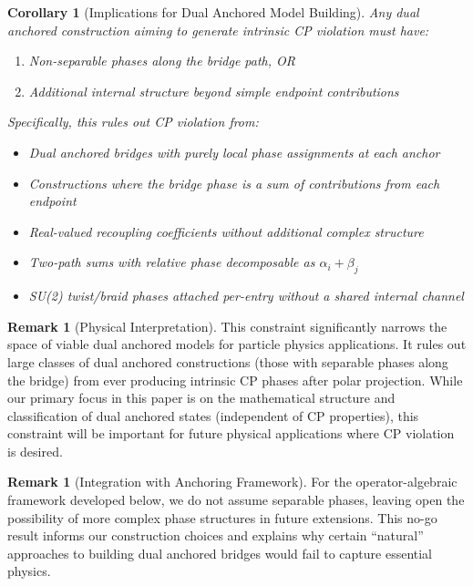 \documentclass[11pt]{article}
\theoremstyle{plain}
\newtheorem{corollary}[theorem]{Corollary}
\theoremstyle{definition}
\newtheorem{remark}[theorem]{Remark}
\begin{document}
\begin{corollary}[Implications for Dual Anchored Model Building]
  \label{cor:phase-separable}
  Any dual anchored construction aiming to generate intrinsic CP violation must have:
  \begin{enumerate}
    \item Non-separable phases along the bridge path, OR
    \item Additional internal structure beyond simple endpoint contributions
  \end{enumerate}

  Specifically, this rules out CP violation from:
  \begin{itemize}
    \item Dual anchored bridges with purely local phase assignments at each anchor
    \item Constructions where the bridge phase is a sum of contributions from each endpoint
    \item Real-valued recoupling coefficients without additional complex structure
    \item Two-path sums with relative phase decomposable as $\alpha_i + \beta_j$
    \item SU(2) twist/braid phases attached per-entry without a shared internal channel
  \end{itemize}
\end{corollary}

\begin{remark}[Physical Interpretation]
  This constraint significantly narrows the space of viable dual anchored models for particle physics applications. It rules out large classes of dual anchored constructions (those with separable phases along the bridge) from ever producing intrinsic CP phases after polar projection. While our primary focus in this paper is on the mathematical structure and classification of dual anchored states (independent of CP properties), this constraint will be important for future physical applications where CP violation is desired.
\end{remark}

\begin{remark}[Integration with Anchoring Framework]
  For the operator-algebraic framework developed below, we do not assume separable phases, leaving open the possibility of more complex phase structures in future extensions. This no-go result informs our construction choices and explains why certain ``natural'' approaches to building dual anchored bridges would fail to capture essential physics.
\end{remark}
\end{document}
